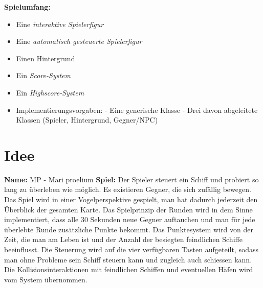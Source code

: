 \documentclass{article}
\begin{document}
\textbf{Spielumfang:}
\begin{itemize}
    \item Eine \textit{interaktive Spielerfigur}
    \item Eine \textit{automatisch gesteuerte Spielerfigur}
    \item Einen Hintergrund
    \item Ein \textit{Score-System}
    \item Ein \textit{Highscore-System}
    \item Implementierungsvorgaben:
        \newline - Eine generische Klasse
        \newline - Drei davon abgeleitete Klassen (Spieler, Hintergrund, Gegner/NPC)
\end{itemize}
\newpage

\section{Idee}
\textbf{Name:}
\newline
MP - Mari proelium
\newline
\textbf{Spiel:}
\newline
Der Spieler steuert ein Schiff und probiert so lang zu überleben wie möglich. Es existieren Gegner, die sich zufällig bewegen.
\newline
Das Spiel wird in einer Vogelperspektive gespielt, man hat dadurch jederzeit den Überblick der gesamten Karte.
\newline
Das Spielprinzip der Runden wird in dem Sinne implementiert, dass alle 30 Sekunden neue Gegner auftauchen und man für jede überlebte Runde zusätzliche Punkte bekommt.
\newline
Das Punktesystem wird von der Zeit, die man am Leben ist und der Anzahl der besiegten feindlichen Schiffe beeinflusst.
\newline
Die Steuerung wird auf die vier verfügbaren Tasten aufgeteilt, sodass man ohne Probleme sein Schiff steuern kann und zugleich auch schiessen kann. Die Kollisionsinteraktionen mit feindlichen Schiffen und eventuellen Häfen wird vom System übernommen.
\newpage
\end{document}
